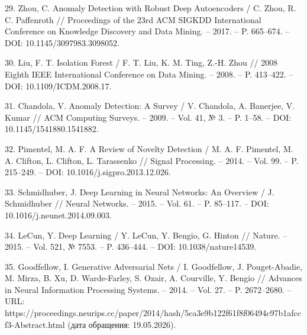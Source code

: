 \documentclass[14pt, a4paper, oneside]{extreport}
\begin{document}
29. Zhou, C. Anomaly Detection with Robust Deep Autoencoders / C. Zhou, R. C. Paffenroth // Proceedings of the 23rd ACM SIGKDD International Conference on Knowledge Discovery and Data Mining. – 2017. – P. 665–674. – DOI: 10.1145/3097983.3098052.

30. Liu, F. T. Isolation Forest / F. T. Liu, K. M. Ting, Z.-H. Zhou // 2008 Eighth IEEE International Conference on Data Mining. – 2008. – P. 413–422. – DOI: 10.1109/ICDM.2008.17.

31. Chandola, V. Anomaly Detection: A Survey / V. Chandola, A. Banerjee, V. Kumar // ACM Computing Surveys. – 2009. – Vol. 41, № 3. – P. 1–58. – DOI: 10.1145/1541880.1541882.

32. Pimentel, M. A. F. A Review of Novelty Detection / M. A. F. Pimentel, M. A. Clifton, L. Clifton, L. Tarassenko // Signal Processing. – 2014. – Vol. 99. – P. 215–249. – DOI: 10.1016/j.sigpro.2013.12.026.

33. Schmidhuber, J. Deep Learning in Neural Networks: An Overview / J. Schmidhuber // Neural Networks. – 2015. – Vol. 61. – P. 85–117. – DOI: 10.1016/j.neunet.2014.09.003.

34. LeCun, Y. Deep Learning / Y. LeCun, Y. Bengio, G. Hinton // Nature. – 2015. – Vol. 521, № 7553. – P. 436–444. – DOI: 10.1038/nature14539.

35. Goodfellow, I. Generative Adversarial Nets / I. Goodfellow, J. Pouget-Abadie, M. Mirza, B. Xu, D. Warde-Farley, S. Ozair, A. Courville, Y. Bengio // Advances in Neural Information Processing Systems. – 2014. – Vol. 27. – P. 2672–2680. – URL: https://proceedings.neurips.cc/paper/2014/hash/5ca3e9b122f61f8f06494c97b1afccf3-Abstract.html (дата обращения: 19.05.2026).
\end{document}
